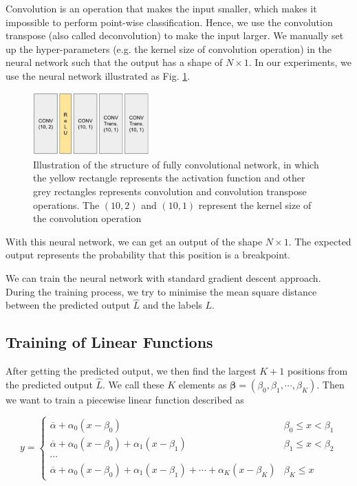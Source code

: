 Convolution is an operation that makes the input smaller, which makes it impossible to perform point-wise classification. Hence, we use the convolution transpose (also called deconvolution) to make the input larger. We manually set up the hyper-parameters (e.g. the kernel size of convolution operation) in the neural network such that the output has a shape of $N\times 1$. In our experiments, we use the neural network illustrated as Fig. \ref{fig:5_fcn}.

\begin{figure}
\centering
\includegraphics[width=0.4\textwidth]{graphs/fcn/fcn.pdf}
\caption{Illustration of the structure of fully convolutional network, in which the yellow rectangle represents the activation function and other grey rectangles represents convolution and convolution transpose operations. The $(10, 2)$ and $(10, 1)$ represent the kernel size of the convolution operation}
\label{fig:5_fcn}
\end{figure}

With this neural network, we can get an output of the shape $N\times 1$. The expected output represents the probability that this position is a breakpoint.

We can train the neural network with standard gradient descent approach. During the training process, we try to minimise the mean square distance between the predicted output $\hat{L}$ and the labels $L$.


\subsection{Training of Linear Functions}

After getting the predicted output, we then find the largest $K+1$ positions from the predicted output $\hat{L}$. We call these $K$ elements as $\boldsymbol{\beta}=(\beta_0, \beta_1, \cdots, \beta_K)$. Then we want to train a piecewise linear function described as 

\begin{equation}
	y=\begin{cases}
		\overline{\alpha} + \alpha_0(x-\beta_0) & \beta_0\leq x<\beta_1 \\
		\overline{\alpha} + \alpha_0(x-\beta_0) + \alpha_1(x-\beta_1) & \beta_1\leq x<\beta_2 \\
		\cdots \\
		\overline{\alpha}+ \alpha_0(x-\beta_0) + \alpha_1(x-\beta_1)+\cdots+\alpha_{K}(x-\beta_K) & \beta_K\leq x
	\end{cases}
\end{equation}

